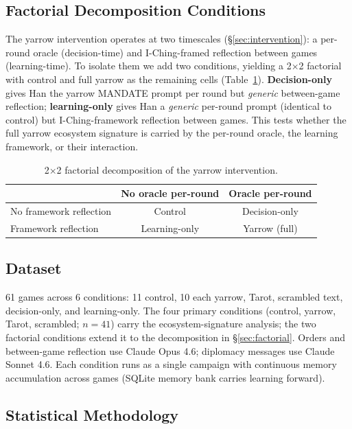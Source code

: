 \documentclass[11pt]{article}
\begin{document}
\subsection{Factorial Decomposition Conditions}
\label{sec:factorial-design}

The yarrow intervention operates at two timescales (\S\ref{sec:intervention}): a per-round oracle (decision-time) and I-Ching-framed reflection between games (learning-time). To isolate them we add two conditions, yielding a 2$\times$2 factorial with control and full yarrow as the remaining cells (Table~\ref{tab:factorial-design}). \textbf{Decision-only} gives Han the yarrow \textsc{MANDATE} prompt per round but \emph{generic} between-game reflection; \textbf{learning-only} gives Han a \emph{generic} per-round prompt (identical to control) but I-Ching-framework reflection between games. This tests whether the full yarrow ecosystem signature is carried by the per-round oracle, the learning framework, or their interaction.

\begin{table}[h]
\centering
\caption{2$\times$2 factorial decomposition of the yarrow intervention.}
\label{tab:factorial-design}
\begin{tabular}{lcc}
\toprule
 & No oracle per-round & Oracle per-round \\
\midrule
No framework reflection & Control & Decision-only \\
Framework reflection & Learning-only & Yarrow (full) \\
\bottomrule
\end{tabular}
\end{table}

\subsection{Dataset}

61 games across 6 conditions: 11 control, 10 each yarrow, Tarot, scrambled text, decision-only, and learning-only. The four primary conditions (control, yarrow, Tarot, scrambled; $n=41$) carry the ecosystem-signature analysis; the two factorial conditions extend it to the decomposition in \S\ref{sec:factorial}. Orders and between-game reflection use Claude Opus 4.6; diplomacy messages use Claude Sonnet 4.6. Each condition runs as a single campaign with continuous memory accumulation across games (SQLite memory bank carries learning forward).

\subsection{Statistical Methodology}
\end{document}
